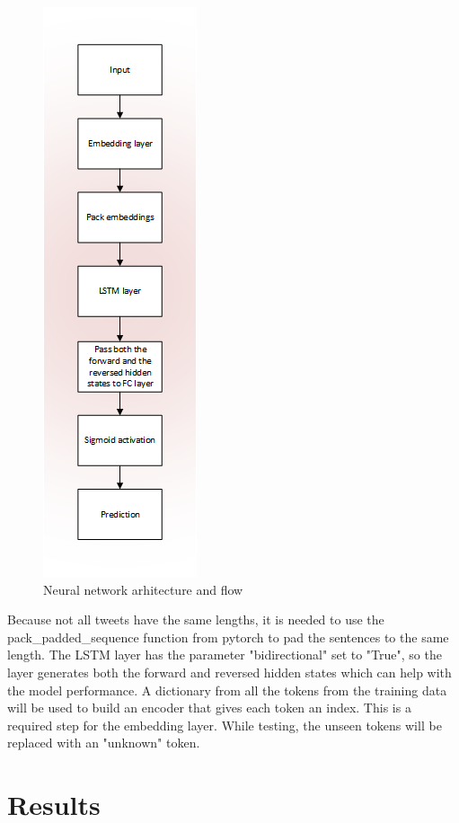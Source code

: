\documentclass[11pt]{article}
\begin{document}
\begin{figure}[h!]
      \begin{center}
  \includegraphics[scale=0.8]{nn}
  \caption{Neural network arhitecture and flow}\label{fig:figure10}
          \end{center}
\end{figure}


  Because not all tweets have the same lengths, it is needed to use the pack\_padded\_sequence function from pytorch to pad the sentences to the same length.
The LSTM layer has the parameter "bidirectional" set to "True", so the layer generates both the forward and reversed hidden states which can help with the model performance.
  A dictionary from all the tokens from the training data will be used to build an encoder that gives each token an index.
This is a required step for the embedding layer.
While testing, the unseen tokens will be replaced with an "unknown" token.

  \section{Results}\label{sec:results}
\end{document}
